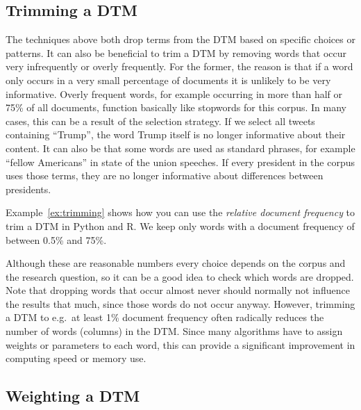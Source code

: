 \subsection{Trimming a DTM}\label{sec:trimdtm}

The techniques above both drop terms from the DTM based on specific choices or patterns.
It can also be beneficial to trim a DTM by removing words that occur very infrequently or overly frequently.
For the former, the reason is that if a word only occurs in a very small percentage of documents it is unlikely to be very informative.
Overly frequent words, for example occurring in more than half or 75\% of all documents, function basically like stopwords for this corpus.
In many cases, this can be a result of the selection strategy. If we select all tweets containing ``Trump'', the word Trump itself is no longer informative about their content.
It can also be that some words are used as standard phrases, for example ``fellow Americans'' in state of the union speeches.
If every president in the corpus uses those terms, they are no longer informative about differences between presidents.


Example~\ref{ex:trimming} shows how you can use the \emph{relative document frequency} to trim a DTM in Python and R.
We keep only words with a document frequency of between 0.5\% and 75\%.

Although these are reasonable numbers every choice depends on the corpus and the research question, so it can be a good idea to check which words are dropped.
Note that dropping words that occur almost never should normally not influence the results that much, since those words do not occur anyway.
However, trimming a DTM to e.g.\ at least 1\% document frequency often radically reduces the number of words (columns) in the DTM.
Since many algorithms have to assign weights or parameters to each word, this can provide a significant improvement in computing speed or memory use.

\subsection{Weighting a DTM}\label{sec:dtmweight}

